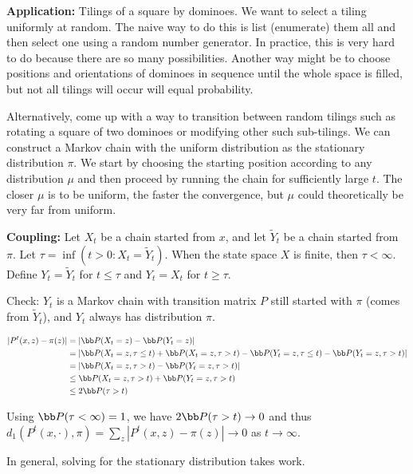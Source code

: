 \documentclass[../../../Master/AppliedStochastics.tex]{subfiles}
\begin{document}
\vspace{10mm}
\textbf{Application:} Tilings of a square by dominoes. We want to select a 
tiling uniformly at random. The naive way to do this is list (enumerate) them 
all and then select one using a random number generator. In practice, this is 
very hard to do because there are so many possibilities. Another way might be 
to choose positions and orientations of dominoes in sequence until the whole 
space is filled, but not all tilings will occur will equal probability. 

\vspace{5mm}
Alternatively, come up with a way to transition between random tilings such as 
rotating a square of two dominoes or modifying other such sub-tilings. We can 
construct a Markov chain with the uniform distribution as the stationary 
distribution $\pi$. We start by choosing the starting position according to any 
distribution $\mu$ and then proceed by running the chain for sufficiently large 
$t$. The closer $\mu$ is to be uniform, the faster the convergence, but $\mu$ 
could theoretically be very far from uniform.

\vspace{10mm}
\textbf{Coupling:} Let $X_t$ be a chain started from $x$, and let $\tilde{Y}_t$ 
be a chain started from $\pi$. Let $\tau=\inf(t>0:X_t=\tilde{Y}_t)$. When the 
state space $X$ is finite, then $\tau<\infty$. Define $Y_t=\tilde{Y}_t$ for 
$t\leq 
\tau$ and $Y_t=X_t$ for $t\geq \tau$. 


\vspace{5mm}
Check: $Y_t$ is a Markov chain with transition matrix $P$ still started with 
$\pi$ (comes from $\tilde{Y}_t$), and $Y_t$ always has distribution $\pi$. 

$$\begin{aligned}
|P^t(x,z)-\pi(z)|&=|\bb P(X_t=z)-\bb P(Y_t=z)|\\&=|\bb P(X_t=z,\tau\leq 
t)+\bb P(X_t=z,\tau> t)-\bb P(Y_t=z,\tau\leq t)-\bb P(Y_t=z,\tau> 
t)|\\&=|\bb P(X_t=z,\tau>t)-\bb P(Y_t=z,\tau> t)|\\&\leq 
\bb P(X_t=z,\tau>t)+\bb P(Y_t=z,\tau>t)\\&\leq 2\bb P(\tau>t)
\end{aligned}$$

Using $\bb P(\tau<\infty)=1$, we have $2\bb P(\tau>t)\to 0$ and thus 
$d_1(P^t(x,\cdot),\pi)=\sum_z|P^t(x,z)-\pi(z)|\to 0$ as $t\to \infty$.

\vspace{10mm}
In general, solving for the stationary distribution takes work.
\end{document}
